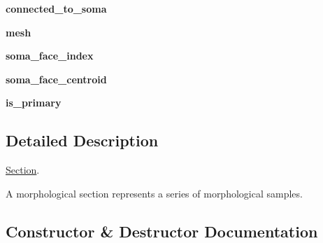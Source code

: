 \begin{DoxyCompactItemize}
\item 
{\bfseries connected\+\_\+to\+\_\+soma}\hypertarget{classmeshy_1_1neuromorphovis_1_1morphologies_1_1__skeleton_1_1section_1_1Section_a2777bbf7d91b6ea10bcb73b0301254ea}{}\label{classmeshy_1_1neuromorphovis_1_1morphologies_1_1__skeleton_1_1section_1_1Section_a2777bbf7d91b6ea10bcb73b0301254ea}

\item 
{\bfseries mesh}\hypertarget{classmeshy_1_1neuromorphovis_1_1morphologies_1_1__skeleton_1_1section_1_1Section_a7bd5d1d66cd81db0aff6c6dd37ffeb53}{}\label{classmeshy_1_1neuromorphovis_1_1morphologies_1_1__skeleton_1_1section_1_1Section_a7bd5d1d66cd81db0aff6c6dd37ffeb53}

\item 
{\bfseries soma\+\_\+face\+\_\+index}\hypertarget{classmeshy_1_1neuromorphovis_1_1morphologies_1_1__skeleton_1_1section_1_1Section_a6a763ab5879fed9cbad89ae21ccaec87}{}\label{classmeshy_1_1neuromorphovis_1_1morphologies_1_1__skeleton_1_1section_1_1Section_a6a763ab5879fed9cbad89ae21ccaec87}

\item 
{\bfseries soma\+\_\+face\+\_\+centroid}\hypertarget{classmeshy_1_1neuromorphovis_1_1morphologies_1_1__skeleton_1_1section_1_1Section_af632ba900a7dab552b15ac7fea2913d9}{}\label{classmeshy_1_1neuromorphovis_1_1morphologies_1_1__skeleton_1_1section_1_1Section_af632ba900a7dab552b15ac7fea2913d9}

\item 
{\bfseries is\+\_\+primary}\hypertarget{classmeshy_1_1neuromorphovis_1_1morphologies_1_1__skeleton_1_1section_1_1Section_a945ed87b2c30dd5b59b6997fbbfcc97a}{}\label{classmeshy_1_1neuromorphovis_1_1morphologies_1_1__skeleton_1_1section_1_1Section_a945ed87b2c30dd5b59b6997fbbfcc97a}

\end{DoxyCompactItemize}


\subsection{Detailed Description}
\hyperlink{classmeshy_1_1neuromorphovis_1_1morphologies_1_1__skeleton_1_1section_1_1Section}{Section}. 

\begin{DoxyVerb}A morphological section represents a series of morphological samples. \end{DoxyVerb}
 

\subsection{Constructor \& Destructor Documentation}
